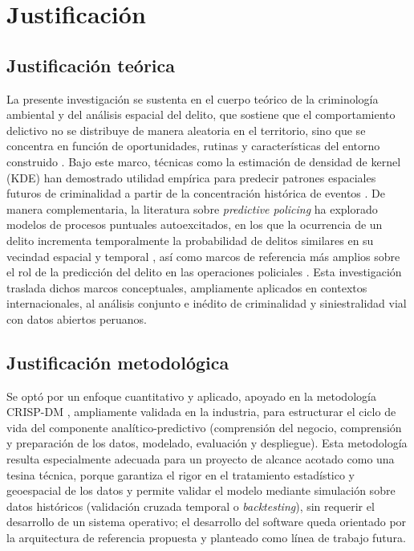 \documentclass[12pt,letterpaper]{report}
\begin{document}
\section{Justificaci\'on}

\subsection{Justificaci\'on te\'orica}
La presente investigaci\'on se sustenta en el cuerpo te\'orico de la criminolog\'ia ambiental y del an\'alisis espacial del delito, que sostiene que el comportamiento delictivo no se distribuye de manera aleatoria en el territorio, sino que se concentra en funci\'on de oportunidades, rutinas y caracter\'isticas del entorno construido \citep{eck2005mapping}. Bajo este marco, t\'ecnicas como la estimaci\'on de densidad de kernel (KDE) han demostrado utilidad emp\'irica para predecir patrones espaciales futuros de criminalidad a partir de la concentraci\'on hist\'orica de eventos \citep{chainey2008kde}. De manera complementaria, la literatura sobre \textit{predictive policing} ha explorado modelos de procesos puntuales autoexcitados, en los que la ocurrencia de un delito incrementa temporalmente la probabilidad de delitos similares en su vecindad espacial y temporal \citep{mohler2011selfexciting}, as\'i como marcos de referencia m\'as amplios sobre el rol de la predicci\'on del delito en las operaciones policiales \citep{perry2013predictive}. Esta investigaci\'on traslada dichos marcos conceptuales, ampliamente aplicados en contextos internacionales, al an\'alisis conjunto e in\'edito de criminalidad y siniestralidad vial con datos abiertos peruanos.

\subsection{Justificaci\'on metodol\'ogica}
Se opt\'o por un enfoque cuantitativo y aplicado, apoyado en la metodolog\'ia CRISP-DM \citep{crispdm2000}, ampliamente validada en la industria, para estructurar el ciclo de vida del componente anal\'itico-predictivo (comprensi\'on del negocio, comprensi\'on y preparaci\'on de los datos, modelado, evaluaci\'on y despliegue). Esta metodolog\'ia resulta especialmente adecuada para un proyecto de alcance acotado como una tesina t\'ecnica, porque garantiza el rigor en el tratamiento estad\'istico y geoespacial de los datos y permite validar el modelo mediante simulaci\'on sobre datos hist\'oricos (validaci\'on cruzada temporal o \textit{backtesting}), sin requerir el desarrollo de un sistema operativo; el desarrollo del software queda orientado por la arquitectura de referencia propuesta y planteado como l\'inea de trabajo futura.
\end{document}
